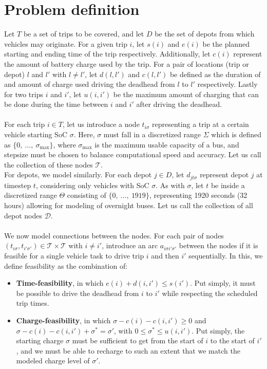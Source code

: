 \documentclass[]{article}
\begin{document}
\section{Problem definition}
\label{sec:problem_def}
  Let $T$ be a set of trips to be covered, and let $D$ be the set of depots from which vehicles may originate. For a given trip $i$, let $s(i)$ and $e(i)$ be the planned starting and ending time of the trip respectively. Additionally, let $c(i)$ represent the amount of battery charge used by the trip. For a pair of locations (trip or depot) $l$ and $l'$ with $l \neq l'$, let $d(l, l')$ and $c(l, l')$ be defined as the duration of and amount of charge used driving the deadhead from $l$ to $l'$ respectively. Lastly for two trips $i$ and $i'$, let $u(i, i')$ be the maximum amount of charging that can be done during the time between $i$ and $i'$ after driving the deadhead.  \\\\
For each trip $i \in T$, let us introduce a node $t_{i\sigma}$ representing a trip at a certain vehicle starting SoC $\sigma$. Here, $\sigma$ must fall in a discretized range $\Sigma$ which is defined as $\{0,\:\dots,\:\sigma_{\max}\}$, where $\sigma_{\max}$ is the maximum usable capacity of a bus, and stepsize must be chosen to balance computational speed and accuracy. Let us call the collection of these nodes $\mathcal{T}$.\\
\noindent For depots, we model similarly. For each depot $j \in D$, let $d_{jt\sigma}$ represent depot $j$ at timestep $t$, considering only vehicles with SoC $\sigma$. As with $\sigma$, let $t$ be inside a discretized range $\Theta$ consisting of $\{0,\:\dots,\:1919\}$, representing 1920 seconds (32 hours) allowing for modeling of overnight buses. Let us call the collection of all depot nodes $\mathcal{D}$. \\\\
We now model connections between the nodes. For each pair of nodes $(t_{i\sigma}, t_{i'\sigma'}) \in \mathcal{T} \times \mathcal{T}$ with $i \neq i'$, introduce an arc $a_{i\sigma i'\sigma'}$ between the nodes if it is feasible for a single vehicle task to drive trip $i$ and then $i'$ sequentially. In this, we define feasibility as the combination of: 
\begin{itemize}
  \item \textbf{Time-feasibility}, in which $e(i) + d(i, i') \leq s(i')$. Put simply, it must be possible to drive the deadhead from $i$ to $i'$ while respecting the scheduled trip times.
  \item \textbf{Charge-feasibility}, in which $\sigma - c(i) - c(i, i') \geq 0$ and $\sigma - c(i) - c(i, i') + \sigma^* = \sigma'$, with $0 \leq \sigma^* \leq u(i, i')$. Put simply, the starting charge $\sigma$ must be sufficient to get from the start of $i$ to the start of $i'$, and we must be able to recharge to such an extent that we match the modeled charge level of $\sigma'$.
\end{itemize}
\end{document}
